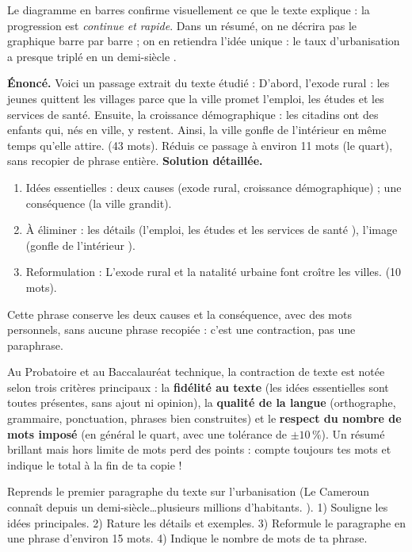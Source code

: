 \documentclass[11pt]{article}
\begin{document}
Le diagramme en barres confirme visuellement ce que le texte explique : la progression est \emph{continue et rapide}. Dans un résumé, on ne décrira pas le graphique barre par barre ; on en retiendra l'idée unique : \og le taux d'urbanisation a presque triplé en un demi-siècle \fg{}.

\begin{exoresolu}
\textbf{Énoncé.} Voici un passage extrait du texte étudié : \og D'abord, l'exode rural : les jeunes quittent les villages parce que la ville promet l'emploi, les études et les services de santé. Ensuite, la croissance démographique : les citadins ont des enfants qui, nés en ville, y restent. Ainsi, la ville gonfle de l'intérieur en même temps qu'elle attire. \fg{} (43 mots). Réduis ce passage à environ 11 mots (le quart), sans recopier de phrase entière.
\tcblower
\textbf{Solution détaillée.}
\begin{enumerate}
\item Idées essentielles : deux causes (exode rural, croissance démographique) ; une conséquence (la ville grandit).
\item À éliminer : les détails (\og l'emploi, les études et les services de santé \fg{}), l'image (\og gonfle de l'intérieur \fg{}).
\item Reformulation : \og L'exode rural et la natalité urbaine font croître les villes. \fg{} (10 mots).
\end{enumerate}
Cette phrase conserve les deux causes et la conséquence, avec des mots personnels, sans aucune phrase recopiée : c'est une contraction, pas une paraphrase.
\end{exoresolu}

\begin{savaistu}
Au Probatoire et au Baccalauréat technique, la contraction de texte est notée selon trois critères principaux : la \textbf{fidélité au texte} (les idées essentielles sont toutes présentes, sans ajout ni opinion), la \textbf{qualité de la langue} (orthographe, grammaire, ponctuation, phrases bien construites) et le \textbf{respect du nombre de mots imposé} (en général le quart, avec une tolérance de $\pm 10\,\%$). Un résumé brillant mais hors limite de mots perd des points : compte toujours tes mots et indique le total à la fin de ta copie !
\end{savaistu}

\begin{exercice}
Reprends le premier paragraphe du texte sur l'urbanisation (\og Le Cameroun connaît depuis un demi-siècle\ldots plusieurs millions d'habitants. \fg{}). 1) Souligne les idées principales. 2) Rature les détails et exemples. 3) Reformule le paragraphe en une phrase d'environ 15 mots. 4) Indique le nombre de mots de ta phrase.
\end{exercice}
\end{document}
